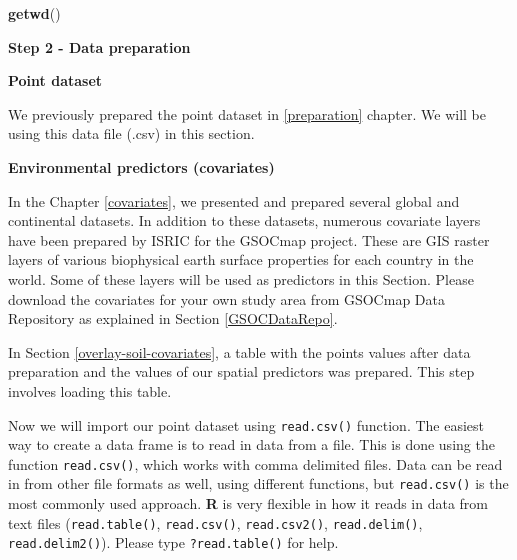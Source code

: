 \documentclass[10pt,b5paper,]{book}
\newenvironment{Shaded}{\begin{snugshade}}{\end{snugshade}}
\newcommand{\CommentTok}[1]{\textcolor[rgb]{0.56,0.35,0.01}{\textit{#1}}}
\newcommand{\KeywordTok}[1]{\textcolor[rgb]{0.13,0.29,0.53}{\textbf{#1}}}
\newcommand{\NormalTok}[1]{#1}
\newcommand{\OperatorTok}[1]{\textcolor[rgb]{0.81,0.36,0.00}{\textbf{#1}}}
\newcommand{\StringTok}[1]{\textcolor[rgb]{0.31,0.60,0.02}{#1}}
\theoremstyle{definition}
\theoremstyle{definition}
\theoremstyle{definition}
\theoremstyle{remark}
\begin{document}
\begin{Shaded}
\begin{Highlighting}[]
\KeywordTok{getwd}\NormalTok{()}
\end{Highlighting}
\end{Shaded}

\textbf{Step 2 - Data preparation}

\textbf{Point dataset}

We previously prepared the point dataset in \ref{preparation} chapter.
We will be using this data file (.csv) in this section.

\textbf{Environmental predictors (covariates)}

In the Chapter \ref{covariates}, we presented and prepared several
global and continental datasets. In addition to these datasets, numerous
covariate layers have been prepared by ISRIC for the GSOCmap project.
These are GIS raster layers of various biophysical earth surface
properties for each country in the world. Some of these layers will be
used as predictors in this Section. Please download the covariates for
your own study area from GSOCmap Data Repository as explained in Section
\ref{GSOCDataRepo}.

In Section \ref{overlay-soil-covariates}, a table with the points values
after data preparation and the values of our spatial predictors was
prepared. This step involves loading this table.

Now we will import our point dataset using \texttt{read.csv()} function.
The easiest way to create a data frame is to read in data from a file.
This is done using the function \texttt{read.csv()}, which works with
comma delimited files. Data can be read in from other file formats as
well, using different functions, but \texttt{read.csv()} is the most
commonly used approach. \textbf{R} is very flexible in how it reads in
data from text files (\texttt{read.table()}, \texttt{read.csv()},
\texttt{read.csv2()}, \texttt{read.delim()}, \texttt{read.delim2()}).
Please type \texttt{?read.table()} for help.

\begin{Shaded}
\end{Shaded}
\end{document}
